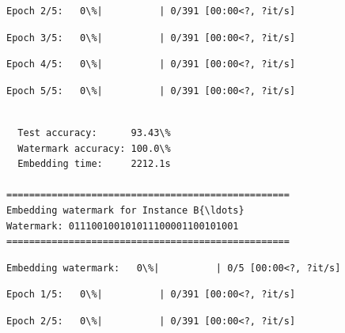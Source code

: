 \documentclass[11pt]{article}
\begin{document}
    \begin{Verbatim}[commandchars=\\\{\}]
Epoch 2/5:   0\%|          | 0/391 [00:00<?, ?it/s]
    \end{Verbatim}

    
    
    \begin{Verbatim}[commandchars=\\\{\}]
Epoch 3/5:   0\%|          | 0/391 [00:00<?, ?it/s]
    \end{Verbatim}

    
    
    \begin{Verbatim}[commandchars=\\\{\}]
Epoch 4/5:   0\%|          | 0/391 [00:00<?, ?it/s]
    \end{Verbatim}

    
    
    \begin{Verbatim}[commandchars=\\\{\}]
Epoch 5/5:   0\%|          | 0/391 [00:00<?, ?it/s]
    \end{Verbatim}

    
    \begin{Verbatim}[commandchars=\\\{\}]

  Test accuracy:      93.43\%
  Watermark accuracy: 100.0\%
  Embedding time:     2212.1s

==================================================
Embedding watermark for Instance B{\ldots}
Watermark: 011100100101011100001100101001
==================================================
    \end{Verbatim}

    
    \begin{Verbatim}[commandchars=\\\{\}]
Embedding watermark:   0\%|          | 0/5 [00:00<?, ?it/s]
    \end{Verbatim}

    
    
    \begin{Verbatim}[commandchars=\\\{\}]
Epoch 1/5:   0\%|          | 0/391 [00:00<?, ?it/s]
    \end{Verbatim}

    
    
    \begin{Verbatim}[commandchars=\\\{\}]
Epoch 2/5:   0\%|          | 0/391 [00:00<?, ?it/s]
    \end{Verbatim}
\end{document}
